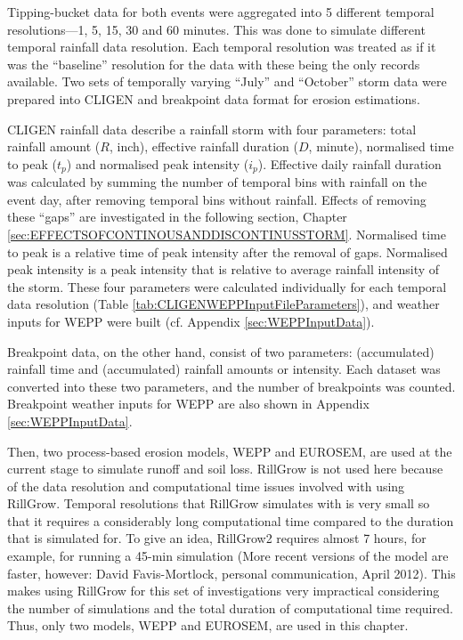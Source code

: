 Tipping-bucket data for both events were aggregated into 5 different temporal
resolutions---1, 5, 15, 30 and 60 minutes. This was done to simulate different
temporal rainfall data resolution. Each temporal resolution was treated as if it
was the ``baseline'' resolution for the data with these being the only records
available. Two sets of temporally varying ``July'' and ``October'' storm data
were prepared into CLIGEN and breakpoint data format for erosion estimations.

CLIGEN rainfall data describe a rainfall storm with four parameters: total
rainfall amount ($R$, inch), effective rainfall duration ($D$, minute),
normalised time to peak ($t_p$) and normalised peak intensity ($i_p$). Effective
daily rainfall duration was calculated by summing the number of temporal bins
with rainfall on the event day, after removing temporal bins without rainfall.
Effects of removing these ``gaps'' are investigated in the following section,
Chapter \ref{sec:EFFECTSOFCONTINOUSANDDISCONTINUSSTORM}. Normalised time to
peak is a relative time of peak intensity after the removal of gaps.
Normalised peak intensity is a peak intensity that is relative to average
rainfall intensity of the storm. These four parameters were calculated
individually for each temporal data resolution (Table
\ref{tab:CLIGENWEPPInputFileParameters}), and weather inputs for WEPP were
built (cf. Appendix \ref{sec:WEPPInputData}).

Breakpoint data, on the other hand, consist of two parameters: (accumulated)
rainfall time and (accumulated) rainfall amounts or intensity. Each dataset was
converted into these two parameters, and the number of breakpoints was counted.
Breakpoint weather inputs for WEPP are also shown in Appendix
\ref{sec:WEPPInputData}.

Then, two process-based erosion models, WEPP and EUROSEM, are used at the
current stage to simulate runoff and soil loss. RillGrow is not used here
because of the data resolution and computational time issues involved
with using RillGrow. Temporal resolutions that RillGrow simulates with is very
small so that it requires a considerably long computational time compared to the
duration that is simulated for. To give an idea, RillGrow2 requires almost 7
hours, for example, for running a 45-min simulation (More recent versions of the
model are faster, however: David Favis-Mortlock, personal communication, April
2012). This makes using RillGrow for this set of investigations very impractical
considering the number of simulations and the total duration of computational
time required. Thus, only two models, WEPP and EUROSEM, are used in this
chapter.

